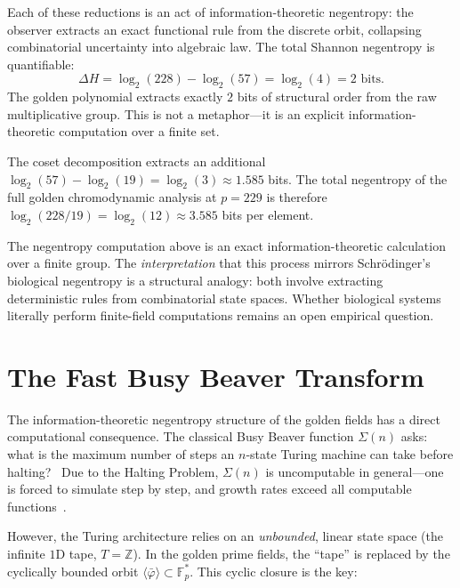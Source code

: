 Each of these reductions is an act of information-theoretic negentropy: the observer
extracts an exact functional rule from the discrete orbit,
collapsing combinatorial uncertainty into algebraic law. The
total Shannon negentropy is quantifiable:
\[
\Delta H = \log_2(228) - \log_2(57) = \log_2(4) = 2 \text{ bits.}
\]
The golden polynomial extracts exactly $2$ bits of structural
order from the raw multiplicative group. This is not a metaphor---it
is an explicit information-theoretic computation over a finite set.

The coset decomposition extracts an additional
$\log_2(57) - \log_2(19) = \log_2(3) \approx 1.585$ bits. The
total negentropy of the full golden chromodynamic analysis at
$p = 229$ is therefore $\log_2(228/19) = \log_2(12) \approx 3.585$
bits per element.

\begin{remark}
The negentropy computation above is an exact information-theoretic
calculation over a finite group. The \emph{interpretation} that this
process mirrors Schr\"odinger's biological negentropy is a structural
analogy: both involve extracting deterministic rules from combinatorial
state spaces. Whether biological systems literally perform finite-field
computations remains an open empirical question.
\end{remark}

\section{The Fast Busy Beaver Transform}
\label{sec:fbbt}

The information-theoretic negentropy structure of the golden fields has a direct
computational consequence. The classical Busy Beaver function
$\Sigma(n)$ asks: what is the maximum number of steps an $n$-state
Turing machine can take before halting?~\cite{rado1962} Due to the
Halting Problem, $\Sigma(n)$ is uncomputable in general---one is
forced to simulate step by step, and growth rates exceed all
computable functions~\cite{aaronson2020}.

However, the Turing architecture relies on an \emph{unbounded},
linear state space (the infinite $1$D tape, $T = \mathbb{Z}$).
In the golden prime fields, the ``tape'' is replaced by the
cyclically bounded orbit $\langle\bar\varphi\rangle \subset
\mathbb{F}_p^*$. This cyclic closure is the key:


